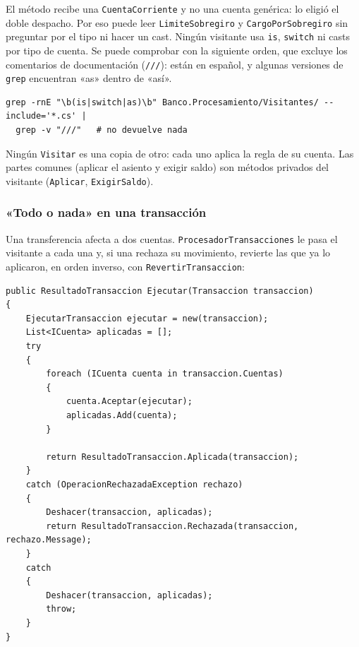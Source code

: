 El método recibe una \texttt{CuentaCorriente} y no una cuenta genérica: lo eligió el doble
despacho. Por eso puede leer \texttt{LimiteSobregiro} y \texttt{CargoPorSobregiro} sin
preguntar por el tipo ni hacer un cast. Ningún visitante usa \texttt{is}, \texttt{switch} ni
casts por tipo de cuenta. Se puede comprobar con la siguiente orden, que excluye los
comentarios de documentación (\texttt{///}): están en español, y algunas versiones de
\texttt{grep} encuentran «as» dentro de «así».

\begin{lstlisting}[language={}, numbers=none, basicstyle=\ttfamily\footnotesize, columns=fullflexible, keepspaces=true]
grep -rnE "\b(is|switch|as)\b" Banco.Procesamiento/Visitantes/ --include='*.cs' |
  grep -v "///"   # no devuelve nada
\end{lstlisting}

Ningún \texttt{Visitar} es una copia de otro: cada uno aplica la regla de su cuenta. Las partes
comunes (aplicar el asiento y exigir saldo) son métodos privados del visitante
(\texttt{Aplicar}, \texttt{ExigirSaldo}).

\subsubsection{«Todo o nada» en una transacción}

Una transferencia afecta a dos cuentas. \texttt{ProcesadorTransacciones} le pasa el
visitante a cada una y, si una rechaza su movimiento, revierte las que ya lo aplicaron, en
orden inverso, con \texttt{RevertirTransaccion}:

\begin{lstlisting}[basicstyle=\ttfamily\footnotesize, columns=fullflexible, keepspaces=true, caption={\texttt{ProcesadorTransacciones.Ejecutar}: todo o nada.}]
public ResultadoTransaccion Ejecutar(Transaccion transaccion)
{
    EjecutarTransaccion ejecutar = new(transaccion);
    List<ICuenta> aplicadas = [];
    try
    {
        foreach (ICuenta cuenta in transaccion.Cuentas)
        {
            cuenta.Aceptar(ejecutar);
            aplicadas.Add(cuenta);
        }

        return ResultadoTransaccion.Aplicada(transaccion);
    }
    catch (OperacionRechazadaException rechazo)
    {
        Deshacer(transaccion, aplicadas);
        return ResultadoTransaccion.Rechazada(transaccion, rechazo.Message);
    }
    catch
    {
        Deshacer(transaccion, aplicadas);
        throw;
    }
}
\end{lstlisting}

